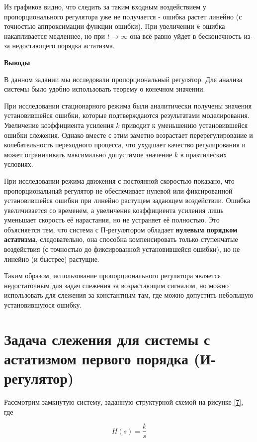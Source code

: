 Из графиков видно, что следить за таким входным воздействием у пропорционального регулятора уже не получается - ошибка растет линейно (с точностью аппроксимации функции ошибки). При увеличении $k$ ошибка накапливается медленнее, но при $t\to \infty$ она всё равно уйдет в бесконечность из-за недостающего порядка астатизма.


\textbf{Выводы}


В данном задании мы исследовали пропорциональный регулятор. Для анализа системы было удобно использовать теорему о конечном значении.


При исследовании стационарного режима были аналитически получены значения установившейся ошибки, которые подтверждаются результатами моделирования. Увеличение коэффициента усиления $k$ приводит к уменьшению установившейся ошибки слежения. Однако вместе с этим заметно возрастает перерегулирование и колебательность переходного процесса, что ухудшает качество регулирования и может ограничивать максимально допустимое значение $k$ в практических условиях.


При исследовании режима движения с постоянной скоростью показано, что пропорциональный регулятор не обеспечивает нулевой или фиксированной установившейся ошибки при линейно растущем задающем воздействии. Ошибка увеличивается со временем, а увеличение коэффициента усиления лишь уменьшает скорость её нарастания, но не устраняет её полностью. Это объясняется тем, что система с П-регулятором обладает \textbf{нулевым порядком астатизма}, следовательно, она способна компенсировать только ступенчатые воздействия (с точностью до фиксированной установившейся ошибки), но не линейно (и быстрее) растущие.


Таким образом, использование пропорционального регулятора является недостаточным для задач слежения за возрастающим сигналом, но можно использовать для слежения за константным там, где можно допустить небольшую установившуюся ошибку.



\section{Задача слежения для системы с астатизмом первого порядка (И-регулятор)}


Рассмотрим замкнутую систему, заданную структурной схемой на рисунке \ref{7}, где

\begin{par}
$$H(s)=\frac{k}{s}$$
\end{par}


